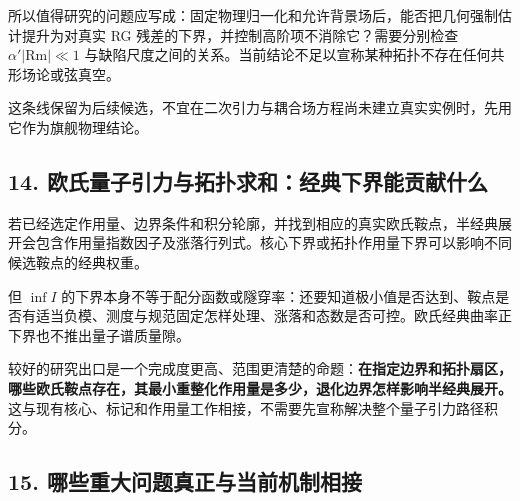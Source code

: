 \documentclass[UTF8,a4paper,11pt,fontset=fandol]{ctexart}
\begin{document}
所以值得研究的问题应写成：固定物理归一化和允许背景场后，能否把几何强制估计提升为对真实
RG 残差的下界，并控制高阶项不消除它？需要分别检查
\(\alpha'|\mathrm{Rm}|\ll1\)
与缺陷尺度之间的关系。当前结论不足以宣称某种拓扑不存在任何共形场论或弦真空。

这条线保留为后续候选，不宜在二次引力与耦合场方程尚未建立真实实例时，先用它作为旗舰物理结论。

\subsection{14.
欧氏量子引力与拓扑求和：经典下界能贡献什么}\label{ux6b27ux6c0fux91cfux5b50ux5f15ux529bux4e0eux62d3ux6251ux6c42ux548cux7ecfux5178ux4e0bux754cux80fdux8d21ux732eux4ec0ux4e48}

若已经选定作用量、边界条件和积分轮廓，并找到相应的真实欧氏鞍点，半经典展开会包含作用量指数因子及涨落行列式。核心下界或拓扑作用量下界可以影响不同候选鞍点的经典权重。

但 \(\inf I\)
的下界本身不等于配分函数或隧穿率：还要知道极小值是否达到、鞍点是否有适当负模、测度与规范固定怎样处理、涨落和态数是否可控。欧氏经典曲率正下界也不推出量子谱质量隙。

较好的研究出口是一个完成度更高、范围更清楚的命题：\textbf{在指定边界和拓扑扇区，哪些欧氏鞍点存在，其最小重整化作用量是多少，退化边界怎样影响半经典展开。}这与现有核心、标记和作用量工作相接，不需要先宣称解决整个量子引力路径积分。

\subsection{15.
哪些重大问题真正与当前机制相接}\label{ux54eaux4e9bux91cdux5927ux95eeux9898ux771fux6b63ux4e0eux5f53ux524dux673aux5236ux76f8ux63a5}
\end{document}
